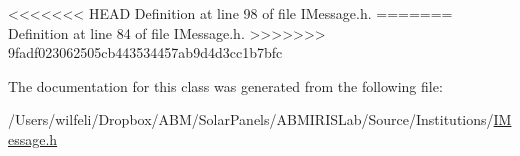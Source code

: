 <<<<<<< HEAD
Definition at line 98 of file I\+Message.\+h.
=======
Definition at line 84 of file I\+Message.\+h.
>>>>>>> 9fadf023062505cb443534457ab9d4d3cc1b7bfc



The documentation for this class was generated from the following file\+:\begin{DoxyCompactItemize}
\item 
/\+Users/wilfeli/\+Dropbox/\+A\+B\+M/\+Solar\+Panels/\+A\+B\+M\+I\+R\+I\+S\+Lab/\+Source/\+Institutions/\hyperlink{_i_message_8h}{I\+Message.\+h}\end{DoxyCompactItemize}
